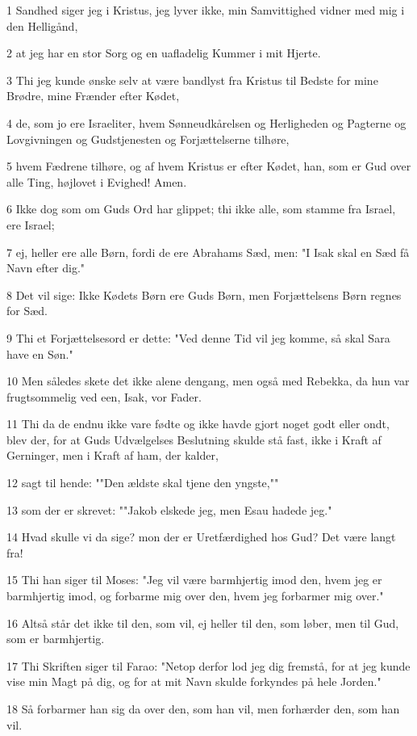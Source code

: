\par 1 Sandhed siger jeg i Kristus, jeg lyver ikke, min Samvittighed vidner med mig i den Helligånd,
\par 2 at jeg har en stor Sorg og en uafladelig Kummer i mit Hjerte.
\par 3 Thi jeg kunde ønske selv at være bandlyst fra Kristus til Bedste for mine Brødre, mine Frænder efter Kødet,
\par 4 de, som jo ere Israeliter, hvem Sønneudkårelsen og Herligheden og Pagterne og Lovgivningen og Gudstjenesten og Forjættelserne tilhøre,
\par 5 hvem Fædrene tilhøre, og af hvem Kristus er efter Kødet, han, som er Gud over alle Ting, højlovet i Evighed! Amen.
\par 6 Ikke dog som om Guds Ord har glippet; thi ikke alle, som stamme fra Israel, ere Israel;
\par 7 ej, heller ere alle Børn, fordi de ere Abrahams Sæd, men: "I Isak skal en Sæd få Navn efter dig."
\par 8 Det vil sige: Ikke Kødets Børn ere Guds Børn, men Forjættelsens Børn regnes for Sæd.
\par 9 Thi et Forjættelsesord er dette: "Ved denne Tid vil jeg komme, så skal Sara have en Søn."
\par 10 Men således skete det ikke alene dengang, men også med Rebekka, da hun var frugtsommelig ved een, Isak, vor Fader.
\par 11 Thi da de endnu ikke vare fødte og ikke havde gjort noget godt eller ondt, blev der, for at Guds Udvælgelses Beslutning skulde stå fast, ikke i Kraft af Gerninger, men i Kraft af ham, der kalder,
\par 12 sagt til hende: ""Den ældste skal tjene den yngste,""
\par 13 som der er skrevet: ""Jakob elskede jeg, men Esau hadede jeg."
\par 14 Hvad skulle vi da sige? mon der er Uretfærdighed hos Gud? Det være langt fra!
\par 15 Thi han siger til Moses: "Jeg vil være barmhjertig imod den, hvem jeg er barmhjertig imod, og forbarme mig over den, hvem jeg forbarmer mig over."
\par 16 Altså står det ikke til den, som vil, ej heller til den, som løber, men til Gud, som er barmhjertig.
\par 17 Thi Skriften siger til Farao: "Netop derfor lod jeg dig fremstå, for at jeg kunde vise min Magt på dig, og for at mit Navn skulde forkyndes på hele Jorden."
\par 18 Så forbarmer han sig da over den, som han vil, men forhærder den, som han vil.
